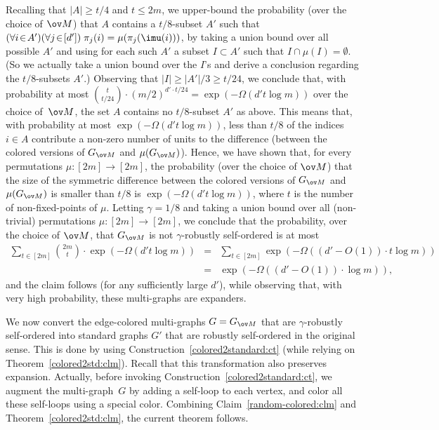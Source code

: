 Recalling that $|A|\geq t/4$ and $t\leq2m$,
we upper-bound the probability (over the choice of $\ov M$)
that $A$ contains a $t/8$-subset $A'$ such that
$(\forall i\!\in\!A')(\forall j\!\in\![d'])\;\pi_j(i)=\mu(\pi_j(\imu(i)))$,
by taking a union bound over all possible $A'$
and using for each such $A'$ a subset $I\subset A'$
such that $I\cap\mu(I)=\emptyset$.
(So we actually take a union bound over the $I$'s
and derive a conclusion regarding the $t/8$-subsets $A'$.)
Observing that $|I|\geq|A'|/3\geq t/24$,
%
we conclude that, with probability at most
$\binom{t}{t/24}\cdot(m/2)^{d'\cdot t/24}=\exp(-\Omega(d' t\log m))$
over the choice of~$\ov M$,
the set $A$ contains no $t/8$-subset $A'$ as above.
This means that,
with probability at most $\exp(-\Omega(d' t\log m))$,
less than $t/8$ of the indices $i\in A$ contribute
a non-zero number of units to the difference
(between the colored versions of $G_{\ov M}$ and $\mu(G_{\ov M})$).
\EDes
Hence, we have shown that, for every permutations $\mu:[2m]\to[2m]$,
the probability (over the choice of $\ov M$) that the size
of the symmetric difference between
the colored versions of $G_{\ov M}$ and $\mu(G_{\ov M})$
is smaller than $t/8$ is $\exp(-\Omega(d' t\log m))$,
where $t$ is the number of non-fixed-points of $\mu$.
%
Letting $\gamma=1/8$ and taking a union bound over
all (non-trivial) permutations $\mu:[2m]\to[2m]$,
we conclude that the probability, over the choice of $\ov M$,
that $G_{\ov M}$ is not $\gamma$-robustly self-ordered is at most
\begin{eqnarray*}
\sum_{t\in[2m]}\binom{2m}{t}\cdot\exp(-\Omega(d' t\log m))
&=& \sum_{t\in[2m]}\exp(-\Omega((d'-O(1))\cdot t\log m)) \\
&=& \exp(-\Omega((d'-O(1))\cdot \log m)),
\end{eqnarray*}
and the claim follows (for any sufficiently large $d'$),
while observing that, with very high probability,
these multi-graphs are expanders.
\Epf

We now convert the edge-colored multi-graphs $G=G_{\ov M}$
that are $\gamma$-robustly self-ordered into standard graphs $G'$
that are robustly self-ordered in the original sense.
This is done by using Construction~\ref{colored2standard:ct}
(while relying on Theorem~\ref{colored2std:clm}).
Recall that this transformation also preserves expansion.
Actually, before invoking Construction~\ref{colored2standard:ct},
we augment the multi-graph~$G$ by adding a self-loop to each vertex,
and color all these self-loops using a special color.
Combining Claim~\ref{random-colored:clm}
and Theorem~\ref{colored2std:clm}, the current theorem follows.
%
\EPF

